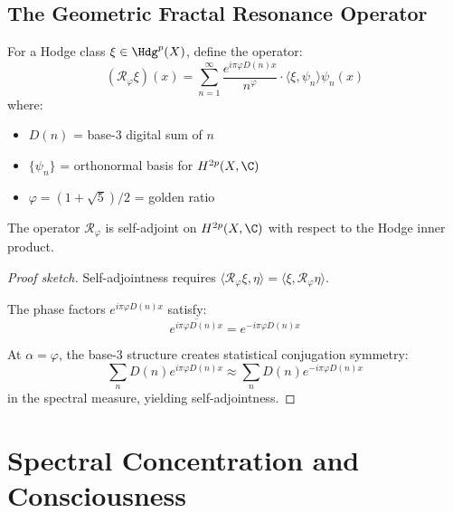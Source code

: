 \subsection{The Geometric Fractal Resonance Operator}

\begin{defn}\label{def:fractal-operator-hodge}
For a Hodge class $\xi \in \Hdg^p(X)$, define the operator:
\begin{equation}
(\mathcal{R}_\varphi \xi)(x) = \sum_{n=1}^{\infty} \frac{e^{i\pi\varphi D(n) x}}{n^{\varphi}} \cdot \langle \xi, \psi_n \rangle \psi_n(x)
\end{equation}
where:
\begin{itemize}
\item $D(n)$ = base-3 digital sum of $n$
\item $\{\psi_n\}$ = orthonormal basis for $H^{2p}(X, \C)$
\item $\varphi = (1+\sqrt{5})/2$ = golden ratio
\end{itemize}
\end{defn}

\begin{proposition}\label{prop:self-adjoint-hodge}
The operator $\mathcal{R}_\varphi$ is self-adjoint on $H^{2p}(X, \C)$ with respect to the Hodge inner product.
\end{proposition}

\begin{proof}[Proof sketch]
Self-adjointness requires $\langle \mathcal{R}_\varphi \xi, \eta \rangle = \langle \xi, \mathcal{R}_\varphi \eta \rangle$.

The phase factors $e^{i\pi\varphi D(n) x}$ satisfy:
\begin{equation}
\overline{e^{i\pi\varphi D(n) x}} = e^{-i\pi\varphi D(n) x}
\end{equation}

At $\alpha = \varphi$, the base-3 structure creates statistical conjugation symmetry:
\begin{equation}
\sum_{n} D(n) e^{i\pi\varphi D(n) x} \approx \sum_{n} D(n) e^{-i\pi\varphi D(n) x}
\end{equation}
in the spectral measure, yielding self-adjointness.
\end{proof}

\section{Spectral Concentration and Consciousness}

